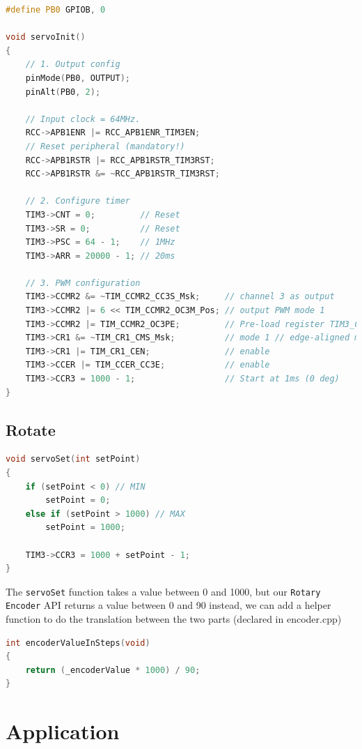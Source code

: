 \documentclass{article}
\begin{document}
\begin{lstlisting}[language=C++, caption={servoInit}]
#define PB0 GPIOB, 0

void servoInit()
{
    // 1. Output config
    pinMode(PB0, OUTPUT);
    pinAlt(PB0, 2);

    // Input clock = 64MHz.
    RCC->APB1ENR |= RCC_APB1ENR_TIM3EN;
    // Reset peripheral (mandatory!)
    RCC->APB1RSTR |= RCC_APB1RSTR_TIM3RST;
    RCC->APB1RSTR &= ~RCC_APB1RSTR_TIM3RST;

    // 2. Configure timer
    TIM3->CNT = 0;         // Reset
    TIM3->SR = 0;          // Reset
    TIM3->PSC = 64 - 1;    // 1MHz
    TIM3->ARR = 20000 - 1; // 20ms

    // 3. PWM configuration
    TIM3->CCMR2 &= ~TIM_CCMR2_CC3S_Msk;     // channel 3 as output
    TIM3->CCMR2 |= 6 << TIM_CCMR2_OC3M_Pos; // output PWM mode 1
    TIM3->CCMR2 |= TIM_CCMR2_OC3PE;         // Pre-load register TIM3_CCR3
    TIM3->CR1 &= ~TIM_CR1_CMS_Msk;          // mode 1 // edge-aligned mode
    TIM3->CR1 |= TIM_CR1_CEN;               // enable
    TIM3->CCER |= TIM_CCER_CC3E;            // enable
    TIM3->CCR3 = 1000 - 1;                  // Start at 1ms (0 deg)
}
\end{lstlisting}

\subsection{Rotate}

\begin{lstlisting}[language=C++, caption={servoSet}]
void servoSet(int setPoint)
{
    if (setPoint < 0) // MIN
        setPoint = 0;
    else if (setPoint > 1000) // MAX
        setPoint = 1000;

    TIM3->CCR3 = 1000 + setPoint - 1;
}
\end{lstlisting}

The \verb|servoSet| function takes a value between 0 and 1000, but our \verb|Rotary Encoder| API returns a value between 0 and 90 instead, we can add a helper function to do the translation between the two parts (declared in encoder.cpp)

\begin{lstlisting}[language=C++, caption={encoderValueInSteps}]
int encoderValueInSteps(void)
{
    return (_encoderValue * 1000) / 90;
}
\end{lstlisting}

\section{Application}
\end{document}
